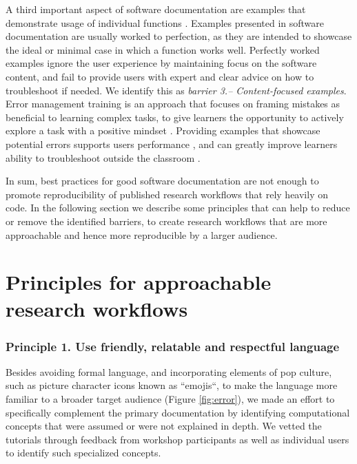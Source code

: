 \documentclass[12pt]{article}
\begin{document}
A third important aspect of software documentation are examples that demonstrate
usage of individual functions \citep{karimzadeh2018top}.
Examples presented in software documentation are usually
worked to perfection, as they are intended to showcase the ideal or minimal case
in which a function works well.
Perfectly worked examples ignore the user experience by
maintaining focus on the software content, and fail to provide users with expert
and clear advice on how to troubleshoot if needed.
We identify this as \textit{barrier 3.-- Content-focused examples}.
Error management training is an approach that focuses on framing mistakes as beneficial
to learning complex tasks, to give learners the opportunity to
actively explore a task with a positive mindset \citep{frese1995error}.
Providing examples that showcase potential errors supports users performance \citep{steele2014error},
and can greatly improve learners ability to troubleshoot outside the classroom
\citep{shannon2015live, nederbragt2020ten}.


In sum, best practices for good software documentation are not enough to promote
reproducibility of published research workflows that rely heavily on code. In the following
section we describe some principles that can help to reduce or remove the
identified barriers, to create
research workflows that are more approachable and hence more reproducible by a
larger audience.

\section*{Principles for approachable research workflows}
\label{sec:addressing}

\subsubsection*{Principle 1. Use friendly, relatable and respectful language}


Besides avoiding formal language, and incorporating elements of pop culture, such as picture
character icons known as ``emojis``, to make the language more familiar to a
broader target audience (Figure \ref{fig:error}), we made an effort to specifically
complement the primary documentation by identifying
computational concepts that were assumed or were not explained in depth.
We vetted the tutorials through feedback from workshop participants as well as
individual users to identify such specialized concepts.
\end{document}

